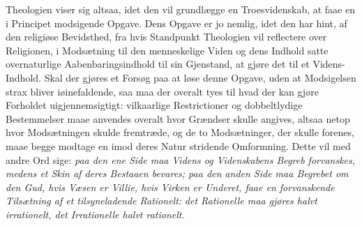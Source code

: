 \documentclass[12pt,a4paper]{book}
\begin{document}
Theologien viser sig altsaa, idet den vil grundlægge en Troesvidenskab, at faae en i
Principet modsigende Opgave. Dens Opgave er jo nemlig, idet den har hint, af den religiøse
Bevidsthed, fra hvis Standpunkt Theologien vil reflectere over Religionen, i Modsætning til
den menneskelige Viden og dens Indhold satte overnaturlige Aabenbaringsindhold til sin
Gjenstand, at gjøre det til et Videns-Indhold. Skal der gjøres et Forsøg paa at løse denne
Opgave, uden at Modsigelsen strax bliver iøinefaldende, saa maa der overalt tyes til hvad
der kan gjøre Forholdet uigjennemsigtigt: vilkaarlige Restrictioner og dobbeltlydige
Bestemmelser maae anvendes overalt hvor Grændser skulle angives, altsaa netop hvor
Modsætningen skulde fremtræde, og de to Modsætninger, der skulle forenes, maae begge
modtage en imod deres Natur stridende Omformning. Dette vil med andre Ord sige: \emph{paa
den ene Side maa Videns og Videnskabens Begreb forvanskes, medens et Skin af deres Bestaaen
bevares; paa den anden Side maa Begrebet om den Gud, hvis Væsen er Villie, hvis Virken er
Underet, faae en forvanskende Tilsætning af et tilsyneladende Rationelt:} \emph{det
Rationelle maa gjøres halvt irrationelt, det Irrationelle halvt rationelt.}
\end{document}

